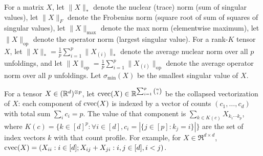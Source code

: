 For a matrix $X$,
let $\|X\|_*$ denote the nuclear (trace) norm (sum of singular values),
let $\|X\|_F$ denote the Frobenius norm (square root of sum of squares of singular values),
let $\|X\|_{\max}$ denote the max norm (elementwise maximum),
let $\|X\|_\text{op}$ denote the operator norm (largest singular value).
For a rank-$K$ tensor $X$,
let $\|X\|_* = \frac{1}{p} \sum_{i=1}^p \|X_{(i)}\|_*$ denote
the average nuclear norm over all $p$ unfoldings,
and let $\|X\|_\text{op} = \frac{1}{p} \sum_{i=1}^p \|X_{(i)}\|_\text{op}$
denote the average operator norm over all $p$ unfoldings.
Let $\sigma_\text{min}(X)$ be the smallest singular value of $X$.

For a tensor $X \in (\mathbb{R}^d)^{\otimes p}$,
let $\operatorname{cvec}(X) \in \mathbb{R}^{\sum_{i=1}^p \binom{n}{i}}$ be
the collapsed vectorization of $X$: each component of $\operatorname{cvec}(X)$
is indexed by a vector of counts $(c_1, \dots, c_d)$ with total sum $\sum_i c_i = p$.
The value of that component is
$\sum_{k \in K(c)} X_{k_1 \cdots k_p}$,
where $K(c) = \{ k \in [d]^p : \forall i \in [d], c_i = |\{ j \in [p] : k_j = i \}| \}$ are the set of index vectors $k$ with that count profile.
For example, for $X \in \Re^{d \times d}$,
$\operatorname{cvec}(X) = (X_{ii} : i \in [d]; X_{ij} + X_{ji} : i,j \in [d], i<j)$.

